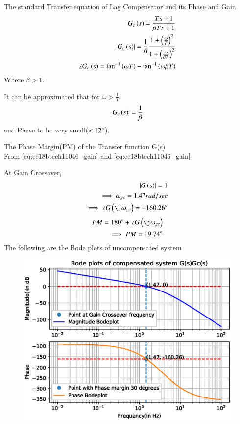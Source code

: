 The standard Transfer equation of Lag Compensator and its Phase and Gain
\begin{align}
G_{c}\left(s\right) = \frac{Ts+1}{\beta Ts+1}
\label{eq:ee18btech11046_comp}
\\
\left\vert G_{c}\left(s\right)\right\vert = \frac{1}{\beta}\frac{1+\left(\frac{\omega}{T}\right)^{2}}{1+\left(\frac{\omega}{\beta T}\right)^{2}}
\label{eq:ee18btech11046_compGain}
\\
\angle G_{c}\left(s\right) = \tan^{-1}\left(\omega T\right)-\tan^{-1}\left(\omega \beta T\right)
\label{eq:ee18btech11046_compPhase}
\end{align}
Where $\beta > 1$.

It can be approximated that for $\omega > \frac{1}{T}$  
\begin{align}
\left\vert G_{c}\left(s\right)\right\vert = \frac{1}{\beta}
\label{eq:ee18btech11046_compGainapprox}
\end{align}
and Phase to be very small($<12\degree$).


The Phase Margin(PM) of the Transfer function G(s)\\
From \eqref{eq:ee18btech11046_gain} and \eqref{eq:ee18btech11046_gain}

At Gain Crossover,
\begin{align}
\abs{G\brak{s}} = 1
\\
\implies
\omega_{gc} = 1.47rad/sec
\\
\implies
\angle G\brak{\j \omega_{gc}} = -160.26\degree
\end{align}
\begin{align}
PM = 180\degree + \angle G\brak{\j \omega_{gc}}
\\
\implies
PM = 19.74\degree
\end{align}
The following are the Bode plots of uncompensated system
\begin{figure}[!h]
\centering
  \includegraphics[width=\columnwidth]{./figs/ee18btech11046_1.eps}
\caption{}
\label{fig:ee18btech11046_uncompensated} 
\end{figure}
%

